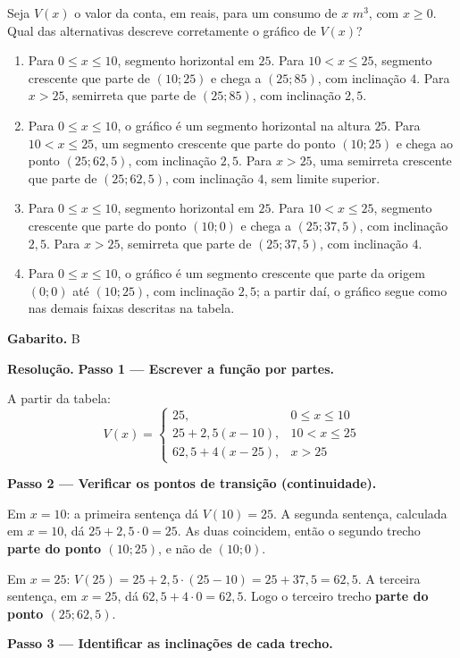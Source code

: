 \documentclass[11pt,a4paper]{article}
\begin{document}
Seja $V(x)$ o valor da conta, em reais, para um consumo de $x$ $m^3$, com $x \ge 0$. Qual das alternativas descreve corretamente o gráfico de $V(x)$?
\begin{enumerate}[label=(\alph*)]
\item Para $0\le x\le10$, segmento horizontal em $25$. Para $10<x\le25$, segmento crescente que parte de $(10;25)$ e chega a $(25;85)$, com inclinação $4$. Para $x>25$, semirreta que parte de $(25;85)$, com inclinação $2{,}5$.
\item Para $0\le x\le10$, o gráfico é um segmento horizontal na altura $25$. Para $10<x\le25$, um segmento crescente que parte do ponto $(10;25)$ e chega ao ponto $(25;62{,}5)$, com inclinação $2{,}5$. Para $x>25$, uma semirreta crescente que parte de $(25;62{,}5)$, com inclinação $4$, sem limite superior.
\item Para $0\le x\le10$, segmento horizontal em $25$. Para $10<x\le25$, segmento crescente que parte do ponto $(10;0)$ e chega a $(25;37{,}5)$, com inclinação $2{,}5$. Para $x>25$, semirreta que parte de $(25;37{,}5)$, com inclinação $4$.
\item Para $0\le x\le10$, o gráfico é um segmento crescente que parte da origem $(0;0)$ até $(10;25)$, com inclinação $2{,}5$; a partir daí, o gráfico segue como nas demais faixas descritas na tabela.
\end{enumerate}

\textbf{Gabarito.} B

\textbf{Resolução.} \textbf{Passo 1 — Escrever a função por partes.}

A partir da tabela:
$$V(x)=\begin{cases}25, & 0\le x\le 10\\[2pt] 25+2{,}5(x-10), & 10<x\le 25\\[2pt] 62{,}5+4(x-25), & x>25\end{cases}$$

\textbf{Passo 2 — Verificar os pontos de transição (continuidade).}

Em $x=10$: a primeira sentença dá $V(10)=25$. A segunda sentença, calculada em $x=10$, dá $25+2{,}5\cdot 0=25$. As duas coincidem, então o segundo trecho \textbf{parte do ponto $(10;25)$}, e não de $(10;0)$.

Em $x=25$: $V(25)=25+2{,}5\cdot(25-10)=25+37{,}5=62{,}5$. A terceira sentença, em $x=25$, dá $62{,}5+4\cdot0=62{,}5$. Logo o terceiro trecho \textbf{parte do ponto $(25;62{,}5)$}.

\textbf{Passo 3 — Identificar as inclinações de cada trecho.}
\end{document}

